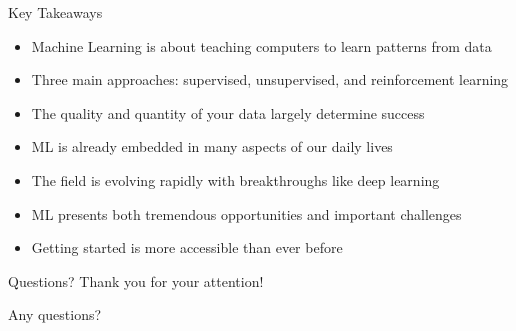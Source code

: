 \documentclass{beamer}
\begin{document}
\begin{frame}{Key Takeaways}
  \begin{itemize}
    \item Machine Learning is about teaching computers to learn patterns from data
    \item Three main approaches: supervised, unsupervised, and reinforcement learning
    \item The quality and quantity of your data largely determine success
    \item ML is already embedded in many aspects of our daily lives
    \item The field is evolving rapidly with breakthroughs like deep learning
    \item ML presents both tremendous opportunities and important challenges
    \item Getting started is more accessible than ever before
  \end{itemize}
\end{frame}

\begin{frame}{Questions?}
  \centering
  \huge Thank you for your attention!
  
  \vspace{1cm}
  
  \large Any questions?
\end{frame}
\end{document}
